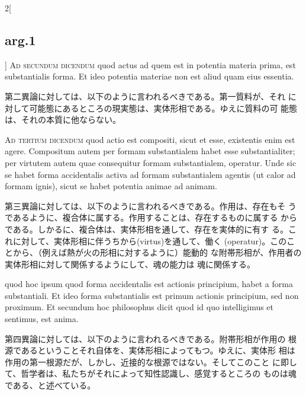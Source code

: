 \documentclass[paper=a4paper,fontsize=10pt,jafontsize=9pt,titlepage]{jlreq}
\begin{document}
\begin{paracol}{2}[\subsection{arg.1}]
 \switchcolumn*[\subsection{ad 2}]
\textsc{Ad secundum dicendum} quod actus ad quem est in potentia
materia prima, est substantialis forma. Et ideo potentia materiae non
est aliud quam eius essentia.

\switchcolumn

 第二異論に対しては、以下のように言われるべきである。第一質料が、それ
 に対して可能態にあるところの現実態は、実体形相である。ゆえに質料の可
 能態は、それの本質に他ならない。

 \switchcolumn*[\subsection{ad 3}]
 \textsc{Ad tertium dicendum} quod actio est
 compositi, sicut et esse, existentis enim est agere. Compositum autem per
 formam substantialem habet esse substantialiter; per virtutem autem quae
 consequitur formam substantialem, operatur. Unde sic se habet forma
 accidentalis activa ad formam substantialem agentis (ut calor ad formam ignis),
 sicut se habet potentia animae ad animam.

\switchcolumn

 第三異論に対しては、以下のように言われるべきである。作用は、存在もそ
 うであるように、複合体に属する。作用することは、存在するものに属する
 からである。しかるに、複合体は、実体形相を通して、存在を実体的に有す
 る。これに対して、実体形相に伴うちから(virtus)を通して、働く
 (operatur)。このことから、（例えば熱が火の形相に対するように）能動的
 な附帯形相が、作用者の実体形相に対して関係するようにして、魂の能力は
 魂に関係する。

  quod hoc ipsum quod forma accidentalis
est actionis principium, habet a forma substantiali. Et ideo forma
substantialis est primum actionis principium, sed non proximum. Et
secundum hoc philosophus dicit quod id quo intelligimus et sentimus,
est anima.


\switchcolumn

 第四異論に対しては、以下のように言われるべきである。附帯形相が作用の
 根源であるということそれ自体を、実体形相によってもつ。ゆえに、実体形
 相は作用の第一根源だが、しかし、近接的な根源ではない。そしてこのこと
 に即して、哲学者は、私たちがそれによって知性認識し、感覚するところの
 ものは魂である、と述べている。


\end{paracol}
\end{document}
